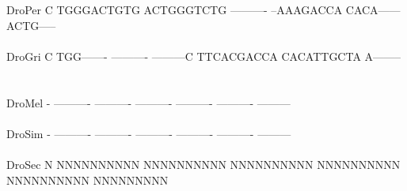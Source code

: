 \documentclass[11pt,twoside,reqno,a4paper]{article}
\begin{document}
{DroPer	C	TGGGACTGTG	ACTGGGTCTG	----------	--AAAGACCA	CACA------	ACTG-----\\
\hspace*{7\charwidth}\hspace*{1\charwidth}\hspace*{1\charwidth}\hspace*{1\charwidth}\hspace*{1\charwidth}\hspace*{1\charwidth}\hspace*{1\charwidth}\\
DroGri	C	TGG-------	----------	---------C	TTCACGACCA	CACATTGCTA	A--------\\
\hspace*{7\charwidth}\hspace*{1\charwidth}\hspace*{1\charwidth}\hspace*{1\charwidth}\hspace*{1\charwidth}\hspace*{1\charwidth}\hspace*{1\charwidth}\\
\\
DroMel	-	----------	----------	----------	----------	----------	---------\\
\hspace*{7\charwidth}\hspace*{1\charwidth}\hspace*{1\charwidth}\hspace*{1\charwidth}\hspace*{1\charwidth}\hspace*{1\charwidth}\hspace*{1\charwidth}\\
DroSim	-	----------	----------	----------	----------	----------	---------\\
\hspace*{7\charwidth}\hspace*{1\charwidth}\hspace*{1\charwidth}\hspace*{1\charwidth}\hspace*{1\charwidth}\hspace*{1\charwidth}\hspace*{1\charwidth}\\
DroSec	N	NNNNNNNNNN	NNNNNNNNNN	NNNNNNNNNN	NNNNNNNNNN	NNNNNNNNNN	NNNNNNNNN\\
\hspace*{7\charwidth}\hspace*{1\charwidth}\hspace*{1\charwidth}\hspace*{1\charwidth}\hspace*{1\charwidth}\hspace*{1\charwidth}\hspace*{1\charwidth}\\
}
\end{document}
